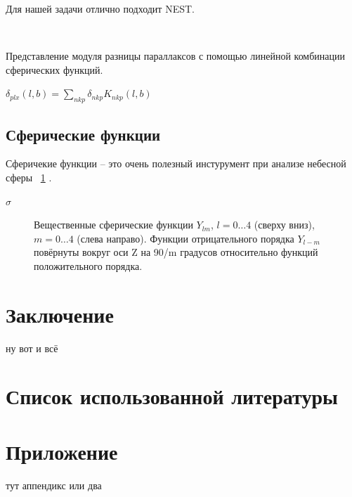 \documentclass[14pt]{article} %
\begin{document}
Для нашей задачи отлично подходит NEST.

~\cite{wiki:healpix} 


Представление модуля разницы параллаксов с помощью линейной комбинации сферических функций.

$\delta_{plx}(l,b) = \sum_{nkp}\delta_{nkp}K_{nkp}(l,b)$

\subsection{Сферические функции}\label{sub:smthsf}
Сферичекие функции -- это очень полезный инстурумент при анализе небесной сферы ~\ref{img:sf} .
~\cite{book:sf}



$\sigma$



\begin{figure}[h!]
\caption{Вещественные сферические функции $Y_{lm}$, $l=0…4$ (сверху вниз), $m=0…4$ (слева направо). Функции отрицательного порядка $Y_{l-m}$ повёрнуты вокруг оси Z на 90/m градусов относительно функций положительного порядка.}
\label{img:sf}
\end{figure}



\section{Заключение}\label{conclusion}
		ну вот и всё \cite{book:fourier} 

\newpage
\section{Список использованной литературы}\label{conclusionlit}
%
%
\printbibliography[type=online,title={Online only}]
\printbibliography[type=book,title={Статьи:}]


\appendix

\section*{Приложение}
тут аппендикс или два 
\end{document}

